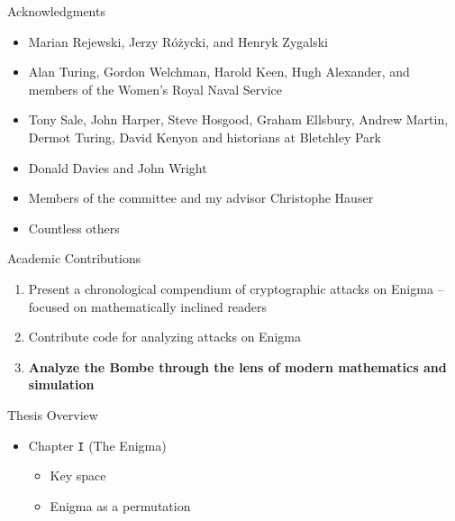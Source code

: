 \documentclass[hyphens,aspectratio=169]{beamer}
\begin{document}
\begin{frame}[fragile]{Acknowledgments}
	\begin{itemize}
		\item Marian Rejewski, Jerzy Różycki, and Henryk Zygalski
		      \pause
		      \vspace{0.5em}
		\item Alan Turing, Gordon Welchman, Harold Keen, Hugh Alexander, and members of the Women's Royal Naval Service
		      \pause
		      \vspace{0.5em}
		\item Tony Sale, John Harper, Steve Hosgood, Graham Ellsbury, Andrew Martin, Dermot Turing, David Kenyon
		      and historians at Bletchley Park
		      \pause
		      \vspace{0.5em}
		\item Donald Davies and John Wright
		      \pause
		      \vspace{0.5em}
		\item Members of the committee and my advisor Christophe Hauser
		      \pause
		      \vspace{0.5em}
		\item Countless others
	\end{itemize}
\end{frame}

\begin{frame}[fragile]{Academic Contributions}
	\begin{enumerate}
		\item Present a chronological compendium of cryptographic attacks on Enigma -- focused on mathematically inclined readers
		      \pause
		      \vspace{5mm}
		\item Contribute code for analyzing attacks on Enigma
		      \pause
		      \vspace{5mm}

		\item {\bf{Analyze the Bombe through the lens of modern mathematics and simulation}}
	\end{enumerate}
\end{frame}

\begin{frame}[fragile]{Thesis Overview}
	\begin{itemize}
		\item Chapter \texttt{I} (The Enigma)
		      \vspace{1em}
		      \begin{itemize}
			      \setlength\itemsep{1em}
			      \item Key space
			      \item Enigma as a permutation
		      \end{itemize}
	\end{itemize}

\end{frame}
\end{document}
